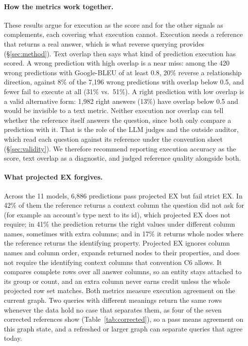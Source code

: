 \paragraph{How the metrics work together.} These results argue for execution as the score and for the other signals as complements, each covering what execution cannot. Execution needs a reference that returns a real answer, which is what reverse querying provides (\S\ref{sec:method}). Text overlap then says what kind of prediction execution has scored. A wrong prediction with high overlap is a near miss: among the 420 wrong predictions with Google-BLEU of at least 0.8, 20\% reverse a relationship direction, against 8\% of the 7,196 wrong predictions with overlap below 0.5, and fewer fail to execute at all (31\% vs.\ 51\%). A right prediction with low overlap is a valid alternative form: 1,982 right answers (13\%) have overlap below 0.5 and would be invisible to a text metric. Neither execution nor overlap can tell whether the reference itself answers the question, since both only compare a prediction with it. That is the role of the LLM judges and the outside auditor, which read each question against its reference under the convention sheet (\S\ref{sec:validity}). We therefore recommend reporting execution accuracy as the score, text overlap as a diagnostic, and judged reference quality alongside both.

\paragraph{What projected EX forgives.} Across the 11 models, 6,886 predictions pass projected EX but fail strict EX. In 42\% of them the reference returns a context column the question did not ask for (for example an account's type next to its id), which projected EX does not require; in 41\% the prediction returns the right values under different column names, sometimes with extra columns; and in 17\% it returns whole nodes where the reference returns the identifying property. Projected EX ignores column names and column order, expands returned nodes to their properties, and does not require the identifying context columns that convention C6 allows. It compares complete rows over all answer columns, so an entity stays attached to its group or count, and an extra column never earns credit unless the whole projected row set matches. Both metrics measure execution agreement on the current graph. Two queries with different meanings return the same rows whenever the data hold no case that separates them, as four of the seven corrected references show (Table~\ref{tab:corrected}), so a pass means agreement on this graph state, and a refreshed or larger graph can separate queries that agree today.

